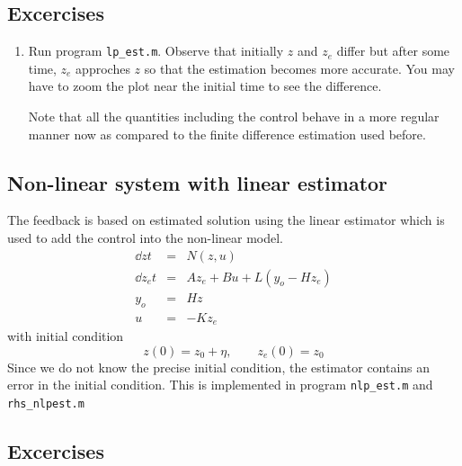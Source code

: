 \documentclass[12pt]{article}
\begin{document}
\subsection{Excercises}

\begin{enumerate}

\item Run program {\tt lp\_est.m}. Observe that initially $z$ and $z_e$ differ but after some time, $z_e$ approches $z$ so that the estimation becomes more accurate. You may have to zoom the plot near the initial time to see the difference.

Note that all the quantities including the control behave in a more regular manner now as compared to the finite difference estimation used before.

\end{enumerate}


\subsection{Non-linear system with linear estimator}

The feedback is based on estimated solution using the linear estimator which is used to add the control into the non-linear model.
\begin{eqnarray*}
\dd{z}{t} &=& N(z, u) \\
\dd{z_e}{t} &=& A z_e + B u + L(y_o - H z_e) \\
y_o &=& H z \\
u &=& -K z_e
\end{eqnarray*}
with initial condition
\[
z(0) = z_0 + \eta, \qquad z_e(0) = z_0
\]
Since we do not know the precise initial condition, the estimator contains an error in the initial condition. This is implemented in program {\tt nlp\_est.m} and {\tt rhs\_nlpest.m}
\subsection{Excercises}
\end{document}
